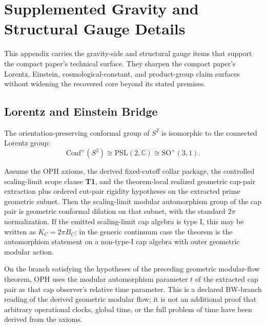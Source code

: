 \section{Supplemented Gravity and Structural Gauge Details}
\label{app:compact-technical-port}

This appendix carries the gravity-side and structural gauge items that support the compact paper's
technical surface. They sharpen the compact paper's Lorentz,
Einstein, cosmological-constant, and product-group claim surfaces without widening the recovered
core beyond its stated premises.

\subsection{Lorentz and Einstein Bridge}

\begin{theorem}
The orientation-preserving conformal group of \(S^2\) is isomorphic to the connected Lorentz
group:
\[
\mathrm{Conf}^+(S^2)\cong \mathrm{PSL}(2,\mathbb C)\cong \mathrm{SO}^+(3,1).
\]
\end{theorem}

\begin{theorem}
Assume the OPH axioms, the derived fixed-cutoff collar package, the controlled scaling-limit
scope clause \textbf{T1}, and the theorem-local realized geometric cap-pair extraction plus
ordered cut-pair rigidity hypotheses on the extracted prime geometric subnet. Then the
scaling-limit modular automorphism group of the cap pair is geometric conformal dilation on that
subnet, with the standard \(2\pi\) normalization. If the emitted scaling-limit cap algebra
is type I, this may be written as \(K_C=2\pi B_C\); in the generic continuum case the
theorem is the automorphism statement on a non-type-I cap algebra with outer geometric modular
action.
\end{theorem}

\begin{definition}
On the branch satisfying the hypotheses of the preceding geometric modular-flow theorem, OPH uses
the modular automorphism parameter \(t\) of the extracted cap pair as that cap observer's relative
time parameter. This is a declared BW-branch reading of the derived geometric modular flow; it is
not an additional proof that arbitrary operational clocks, global time, or the full problem of time
have been derived from the axioms.
\end{definition}

